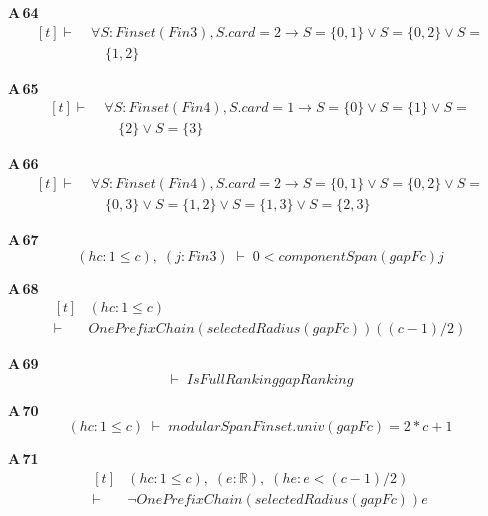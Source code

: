 \noindent\textbf{A\,64}\quad{}
{\footnotesize\[ \begin{aligned}[t]
\vdash\;&\forall \mathit{S} : \mathit{Finset} (\mathit{Fin} 3), \mathit{S}.\mathit{card} = 2 \to \mathit{S} = \{ 0,1\} \vee \mathit{S} = \{ 0,2\} \vee \mathit{S} =\\
&\quad \{ 1,2\}
\end{aligned} \]}

\noindent\textbf{A\,65}\quad{}
{\footnotesize\[ \begin{aligned}[t]
\vdash\;&\forall \mathit{S} : \mathit{Finset} (\mathit{Fin} 4), \mathit{S}.\mathit{card} = 1 \to \mathit{S} = \{ 0\} \vee \mathit{S} = \{ 1\} \vee \mathit{S} =\\
&\quad \{ 2\} \vee \mathit{S} = \{ 3\}
\end{aligned} \]}

\noindent\textbf{A\,66}\quad{}
{\footnotesize\[ \begin{aligned}[t]
\vdash\;&\forall \mathit{S} : \mathit{Finset} (\mathit{Fin} 4), \mathit{S}.\mathit{card} = 2 \to \mathit{S} = \{ 0,1\} \vee \mathit{S} = \{ 0,2\} \vee \mathit{S} =\\
&\quad \{ 0,3\} \vee \mathit{S} = \{ 1,2\} \vee \mathit{S} = \{ 1,3\} \vee \mathit{S} = \{ 2,3\}
\end{aligned} \]}

\noindent\textbf{A\,67}\quad{}
{\footnotesize\[ (\mathit{hc} : 1 \leq \mathit{c}),\; (\mathit{j} : \mathit{Fin} 3) \;\vdash\; 0 < \mathit{componentSpan} (\mathit{gapF} \mathit{c}) \mathit{j} \]}

\noindent\textbf{A\,68}\quad{}
{\footnotesize\[ \begin{aligned}[t]
&(\mathit{hc} : 1 \leq \mathit{c})\\
\vdash\;&\mathit{OnePrefixChain} (\mathit{selectedRadius} (\mathit{gapF} \mathit{c})) ((\mathit{c} - 1) / 2)
\end{aligned} \]}

\noindent\textbf{A\,69}\quad{}
{\footnotesize\[ \vdash\; \mathit{IsFullRanking} \mathit{gapRanking} \]}

\noindent\textbf{A\,70}\quad{}
{\footnotesize\[ (\mathit{hc} : 1 \leq \mathit{c}) \;\vdash\; \mathit{modularSpan} \mathit{Finset}.\mathit{univ} (\mathit{gapF} \mathit{c}) = 2 * \mathit{c} + 1 \]}

\noindent\textbf{A\,71}\quad{}
{\footnotesize\[ \begin{aligned}[t]
&(\mathit{hc} : 1 \leq \mathit{c}),\; (\mathit{e} : \mathbb{R} ),\; (\mathit{he} : \mathit{e} < (\mathit{c} - 1) / 2)\\
\vdash\;&\neg \mathit{OnePrefixChain} (\mathit{selectedRadius} (\mathit{gapF} \mathit{c})) \mathit{e}
\end{aligned} \]}

